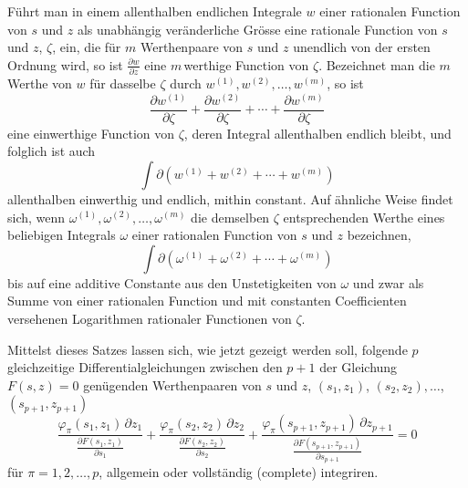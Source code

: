 \documentclass[a4paper,12pt,leqno]{article}
\begin{document}
F\"{u}hrt man in einem allenthalben endlichen Integrale $w$ einer
rationalen Function von $s$ und $z$ als unabh\"{a}ngig
ver\"{a}nderliche Gr\"{o}sse eine rationale Function von $s$ und
$z$, $\zeta$, ein, die f\"{u}r $m$ Werthenpaare von $s$ und $z$
unendlich von der ersten Ordnung wird, so ist
$\displaystyle \frac{\partial w}{\partial z}$
eine $m \,$\-werthige Function von $\zeta$.  Bezeichnet man die $m$
Werthe von $w$ f\"{u}r dasselbe $\zeta$ durch
$w^{(1)}, w^{(2)},\ldots, w^{(m)}$, so ist
\[    \frac{\partial w^{(1)}}{\partial \zeta}
    + \frac{\partial w^{(2)}}{\partial \zeta} + \cdots
    + \frac{\partial w^{(m)}}{\partial \zeta} \]
eine einwerthige Function von $\zeta$, deren Integral
allenthalben endlich bleibt, und folglich ist auch
\[ \int \partial ( w^{(1)} + w^{(2)} + \cdots + w^{(m)} ) \]
allenthalben einwerthig und endlich, mithin constant.  Auf
\"{a}hnliche Weise findet sich, wenn
$\omega^{(1)}, \omega^{(2)},\ldots, \omega^{(m)}$
die demselben $\zeta$ entsprechenden Werthe eines beliebigen
Integrals $\omega$ einer rationalen Function von $s$ und $z$
bezeichnen,
\[ \int \partial ( \omega^{(1)} + \omega^{(2)} + \cdots + \omega^{(m)}) \]
bis auf eine additive Constante aus den Unstetigkeiten von
$\omega$ und zwar als Summe von einer rationalen Function und mit
constanten Coefficienten versehenen Logarithmen rationaler
Functionen von $\zeta$.

Mittelst dieses Satzes lassen sich, wie jetzt gezeigt werden
soll, folgende $p$ gleichzeitige Differentialgleichungen
zwischen den $p + 1$ der Gleichung $F(s, z) = 0$ gen\"{u}genden
Werthenpaaren von $s$ und $z$,
$(s_1, z_1)$, $(s_2, z_2),\ldots$, $(s_{p+1}, z_{p+1})$
\[       \frac{\varphi_\pi(s_1, z_1) \, \partial z_1}{\displaystyle
            \frac{\partial F(s_1, z_1)}{\partial s_1}}
       + \frac{\varphi_\pi(s_2, z_2) \, \partial z_2}{\displaystyle
            \frac{\partial F(s_2, z_2)}{\partial s_2}}
       + \frac{\varphi_\pi(s_{p+1}, z_{p+1}) \, \partial z_{p+1}}{\displaystyle
            \frac{\partial F(s_{p+1}, z_{p+1})}{\partial s_{p+1}}}
   = 0 \]
f\"{u}r $\pi = 1,2,\ldots, p$, allgemein oder vollst\"{a}ndig
(complete) integriren.
\end{document}
